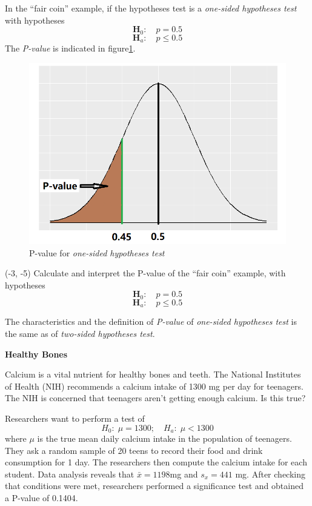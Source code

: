 \documentclass[a4paper, 12pt,twoside]{book}
\begin{document}
\begin{itemize}
In the ``fair coin'' example, if the hypotheses test is a \textit{one-sided hypotheses test} with hypotheses
$$\textbf{H}_0:\quad p=0.5$$
$$\textbf{H}_a:\quad p\leq 0.5$$ 
The \textit{P-value} is indicated in figure\ref{PvalueOneSide}.
\begin{figure}[H]
\centering
\includegraphics[scale=0.3]{PvalueOneSide}
\caption{P-value for \textit{one-sided hypotheses test}}
\label{PvalueOneSide}
\end{figure}

\begin{textblock}{4}(-3, -5)
Calculate and interpret the P-value of the ``fair coin'' example, with hypotheses $$\textbf{H}_0:\quad p=0.5$$
$$\textbf{H}_a:\quad p\leq 0.5$$ 
\end{textblock}
The characteristics and the definition of \textit{P-value} of \textit{one-sided hypotheses test} is the same as of \textit{two-sided hypotheses test}.\vspace{0.3cm}  

\colorbox{champagne}{\parbox{0.9\textwidth}{
\textbf{Healthy Bones}\vspace{0.3cm}

Calcium is a vital nutrient for healthy bones and teeth. The National Institutes of Health (NIH) recommends a calcium intake of 1300 mg per day for teenagers. The NIH is concerned that teenagers aren’t getting enough calcium. Is this true?\vspace{0.3cm}

Researchers want to perform a test of
$$H_0:\;\mu=1300;\quad H_a:\; \mu< 1300$$
where $\mu$ is the true mean daily calcium intake in the population of teenagers. They ask a random sample of 20 teens to record their food and drink consumption for 1 day. The researchers then compute the calcium intake for each student. Data analysis reveals that $\bar{x} =1198$mg and $s_x = 441$ mg. After checking that conditions were met, researchers performed a significance test and obtained a P-value of 0.1404.\vspace{0.3cm}

}}
\end{itemize}
\end{document}
